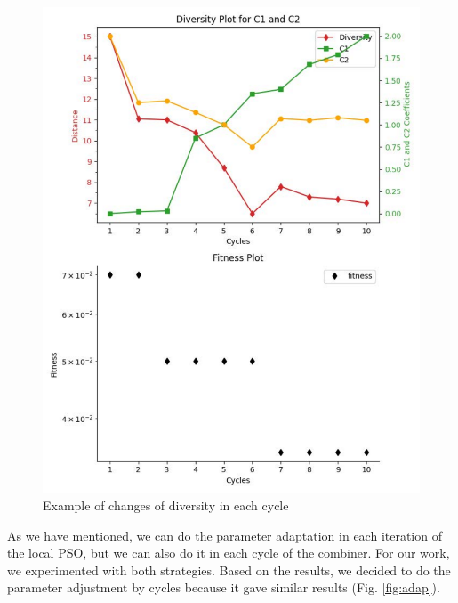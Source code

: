 \documentclass[graybox]{svmult}
\begin{document}
\begin{figure} [htbp]
  \centering
  \includegraphics[angle=0,width=1\textwidth]{myplot.pdf}
  \caption{Example of changes of diversity in each cycle}
  \label{fig:ejemplo} 
\end{figure}

As we have mentioned, we can do the parameter adaptation in each iteration of the local PSO, but we can also do it in each cycle of the combiner. For our work, we experimented with both strategies. Based on the results, we decided to do the parameter adjustment by cycles because it gave similar results (Fig. \ref{fig:adap}).
\end{document}
